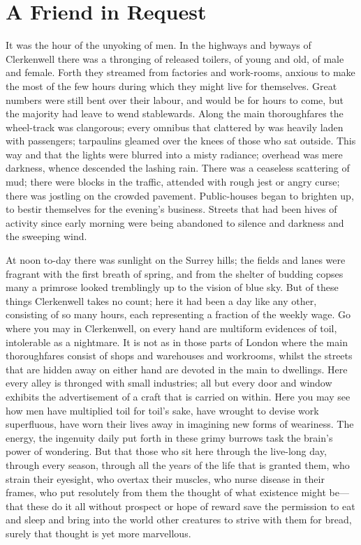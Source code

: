 \chapter{A Friend in Request}

It was the hour of the unyoking of men. In the highways and byways of
Clerkenwell there was a thronging of released toilers, of young and old,
of male and female. Forth they streamed from factories and work-rooms,
anxious to make the most of the few hours during which they might live
for themselves. Great numbers were still bent over their labour, and
would be for hours to come, but the majority had leave to wend
stablewards. Along the main thoroughfares the wheel-track was
clangorous; every omnibus that clattered by was heavily laden with
passengers; tarpaulins gleamed over the knees of those who sat outside.
This way and that the lights were blurred into a misty radiance;
overhead was mere {\protect\hypertarget{24}{}{}}darkness, whence
descended the lashing rain. There was a ceaseless scattering of mud;
there were blocks in the traffic, attended with rough jest or angry
curse; there was jostling on the crowded pavement. Public-houses began
to brighten up, to bestir themselves for the evening's business. Streets
that had been hives of activity since early morning were being abandoned
to silence and darkness and the sweeping wind.

At noon to-day there was sunlight on the Surrey hills; the fields and
lanes were fragrant with the first breath of spring, and from the
shelter of budding copses many a primrose looked tremblingly up to the
vision of blue sky. But of these things Clerkenwell takes no count; here
it had been a day like any other, consisting of so many hours, each
representing a fraction of the weekly wage. Go where you may in
Clerkenwell, on every hand are multiform evidences of toil, intolerable
as a nightmare. It is not as in those parts of London where the main
thoroughfares consist of shops and warehouses and
{\protect\hypertarget{25}{}{}}workrooms, whilst the streets that are
hidden away on either hand are devoted in the main to dwellings. Here
every alley is thronged with small industries; all but every door and
window exhibits the advertisement of a craft that is carried on within.
Here you may see how men have multiplied toil for toil's sake, have
wrought to devise work superfluous, have worn their lives away in
imagining new forms of weariness. The energy, the ingenuity daily put
forth in these grimy burrows task the brain's power of wondering. But
that those who sit here through the live-long day, through every season,
through all the years of the life that is granted them, who strain their
eyesight, who overtax their muscles, who nurse disease in their frames,
who put resolutely from them the thought of what existence might
be---that these do it all without prospect or hope of reward save the
permission to eat and sleep and bring into the world other creatures to
strive with them for bread, surely that thought is yet more marvellous.

